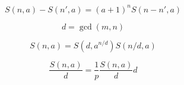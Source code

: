 $$
S(n, a) - S(n', a) = {(a + 1)}^n S(n - n', a)
$$

$$
d = \gcd(m, n)
$$

$$
S(n, a) = S(d, a^{n/d}) S(n/d, a)
$$

 
$$
\frac{S(n, a)}{d}  = \frac{1}{p} \frac{S(n, a)}{d} d
$$



   
